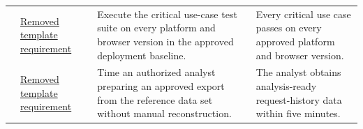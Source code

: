 \begin{tabularx}{\linewidth}{L{2.1cm}L{3.0cm}YL{5.0cm}}
 & \hyperref[Section:RetiredTemplateRequirements]{Removed template requirement} & Execute the critical use-case test suite on every platform and browser version in the approved deployment baseline. & Every critical use case passes on every approved platform and browser version.\\
 & \hyperref[Section:RetiredTemplateRequirements]{Removed template requirement} & Time an authorized analyst preparing an approved export from the reference data set without manual reconstruction. & The analyst obtains analysis-ready request-history data within five minutes.\\
\bottomrule
\end{tabularx}
